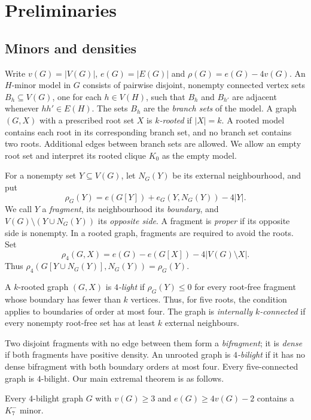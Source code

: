 \section{Preliminaries}\label{sec:preliminaries}

\subsection{Minors and densities}
Write $v(G)=|V(G)|$, $e(G)=|E(G)|$ and $\rho(G)=e(G)-4v(G)$.
An $H$-minor model in $G$ consists of pairwise disjoint, nonempty
connected vertex sets $B_h\subseteq V(G)$, one for each $h\in V(H)$,
such that $B_h$ and $B_{h'}$ are adjacent whenever $hh'\in E(H)$.
The sets $B_h$ are the \emph{branch sets} of the model. A graph
$(G,X)$ with a prescribed root set $X$ is \emph{$k$-rooted} if
$|X|=k$. A rooted model contains each root in its corresponding
branch set, and no branch set contains two roots. Additional edges
between branch sets are allowed.
We allow an empty root set and interpret its rooted clique $K_0$ as
the empty model.

For a nonempty set $Y\subseteq V(G)$, let $N_G(Y)$ be its external
neighbourhood, and put
\[
 \rho_G(Y)=e(G[Y])+e_G(Y,N_G(Y))-4|Y|.
\]
We call $Y$ a \emph{fragment}, its neighbourhood its \emph{boundary},
and $V(G)\setminus(Y\cup N_G(Y))$ its \emph{opposite side}.
A fragment is \emph{proper} if its opposite side is nonempty.
In a rooted graph, fragments are required to avoid the roots. Set
\[
 \rho_4(G,X)=e(G)-e(G[X])-4|V(G)\setminus X|.
\]
Thus $\rho_4(G[Y\cup N_G(Y)],N_G(Y))=\rho_G(Y)$.

A $k$-rooted graph $(G,X)$ is \emph{$4$-light} if
$\rho_G(Y)\leq0$ for every root-free fragment whose boundary has
fewer than $k$ vertices. Thus, for five roots, the condition applies
to boundaries of order at most four. The graph is \emph{internally $k$-connected}
if every nonempty root-free set has at least $k$ external neighbours.

Two disjoint fragments with no edge between them form a
\emph{bifragment}; it is \emph{dense} if both fragments have positive
density. An unrooted graph is
\emph{$4$-bilight} if it has no dense bifragment with both boundary
orders at most four. Every five-connected graph is $4$-bilight. Our main
extremal theorem is as follows.

\begin{theorem}\label{thm:bilight}
Every $4$-bilight graph $G$ with $v(G)\geq3$ and
$e(G)\geq4v(G)-2$ contains a $K_7^{-}$ minor.
\end{theorem}

